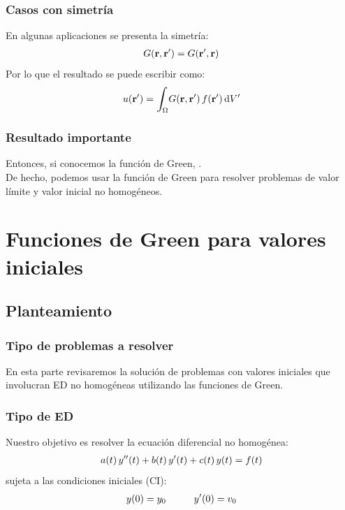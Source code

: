 \documentclass[12pt]{beamer}
\begin{document}
\begin{frame}
\frametitle{Casos con simetría}
En algunas aplicaciones se presenta la simetría:
\pause
\begin{align*}
G (\vb{r}, \vb{\ensuremath{{r}^{\prime}}}) = G (\vb{\ensuremath{{r}^{\prime}}}, \vb{r})
\end{align*}
\pause
Por lo que el resultado se puede escribir como:
\pause
\begin{align*}
u (\vb{\pderivada{r}}) = \scaleint{6ex}_{\bs \Omega} G (\vb{r}, \vb{\pderivada{r}}) \, f (\vb{\pderivada{r}}) \dd{\pderivada{V}}
\end{align*}
\end{frame}

\begin{frame}
\frametitle{Resultado importante}
Entonces, si conocemos la función de Green, \pause {}.
\\
\bigskip
\pause
De hecho, podemos usar la función de Green para resolver problemas de valor límite y valor inicial no homogéneos.
\end{frame}

\section{Funciones de Green para valores iniciales}
\subsection{Planteamiento}

\begin{frame}
\frametitle{Tipo de problemas a resolver}
En esta parte revisaremos la solución de problemas con valores iniciales que involucran ED no homogéneas utilizando las funciones de Green.
\end{frame}

\begin{frame}
\frametitle{Tipo de ED}
Nuestro objetivo es resolver la ecuación diferencial no homogénea:
\pause
\begin{align}
a (t) \, {y}^{\prime \prime} (t) + b (t) \, {y}^{\prime} (t) + c (t) \, y (t) = f (t)
\label{eq:ecuacion_07_04}
\end{align}
\pause
sujeta a las condiciones iniciales (CI):
\pause
\begin{align*}
y (0) = y_{0} \hspace{1cm} {y}^{\prime} (0) = v_{0}
\end{align*}
\end{frame}
\end{document}
